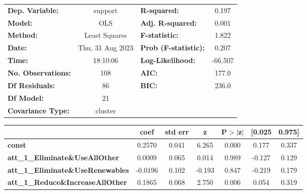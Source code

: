 \begin{center}
\begin{tabular}{lclc}
\toprule
\textbf{Dep. Variable:}                     &     support      & \textbf{  R-squared:         } &     0.197   \\
\textbf{Model:}                             &       OLS        & \textbf{  Adj. R-squared:    } &     0.001   \\
\textbf{Method:}                            &  Least Squares   & \textbf{  F-statistic:       } &     1.822   \\
\textbf{Date:}                              & Thu, 31 Aug 2023 & \textbf{  Prob (F-statistic):} &    0.207    \\
\textbf{Time:}                              &     18:10:06     & \textbf{  Log-Likelihood:    } &   -66.507   \\
\textbf{No. Observations:}                  &         108      & \textbf{  AIC:               } &     177.0   \\
\textbf{Df Residuals:}                      &          86      & \textbf{  BIC:               } &     236.0   \\
\textbf{Df Model:}                          &          21      & \textbf{                     } &             \\
\textbf{Covariance Type:}                   &     cluster      & \textbf{                     } &             \\
\bottomrule
\end{tabular}
\begin{tabular}{lcccccc}
                                            & \textbf{coef} & \textbf{std err} & \textbf{z} & \textbf{P$> |$z$|$} & \textbf{[0.025} & \textbf{0.975]}  \\
\midrule
\textbf{const}                              &       0.2570  &        0.041     &     6.265  &         0.000        &        0.177    &        0.337     \\
\textbf{att\_1\_Eliminate\&UseAllOther}     &       0.0009  &        0.065     &     0.014  &         0.989        &       -0.127    &        0.129     \\
\textbf{att\_1\_Eliminate\&UseRenewables}   &      -0.0196  &        0.102     &    -0.193  &         0.847        &       -0.219    &        0.179     \\
\textbf{att\_1\_Reduce\&IncreaseAllOther}   &       0.1865  &        0.068     &     2.750  &         0.006        &        0.054    &        0.319     \\

\end{tabular}
\end{center}
